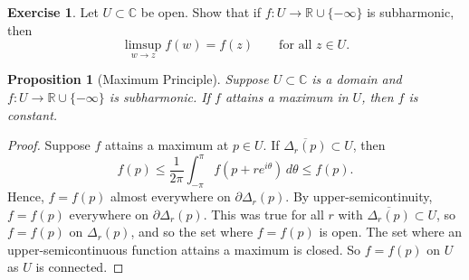 \documentclass[12pt,openany]{book}
\newcommand{\C}{{\mathbb{C}}}
\newcommand{\R}{{\mathbb{R}}}
\theoremstyle{plain}
\newtheorem{prop}[thm]{Proposition}
\theoremstyle{remark}
\theoremstyle{definition}
\newenvironment{exbox}{%
    \def\FrameCommand{\vrule width 1pt \relax\hspace {10pt}}%
    \MakeFramed {\advance \hsize -\width \FrameRestore }%
}{%
    \endMakeFramed
}
\theoremstyle{exercise}
\newtheorem{exercise}{Exercise}[section]
\theoremstyle{example}
\begin{document}
\begin{exbox}
\begin{exercise}
Let $U \subset \C$ be open.
Show that if $f \colon U \to \R \cup\{- \infty \}$ is subharmonic,
then 
\begin{equation*}
\limsup_{w \to z} f(w) = f(z) 
\qquad \text{for all $z \in U$.}
\end{equation*}
\end{exercise}
\end{exbox}

\begin{prop}[Maximum Principle]
Suppose $U \subset \C$ is a domain and $f \colon U \to \R \cup \{ -\infty \}$
is subharmonic.  If $f$ attains a maximum in $U$, then $f$ is constant.
\end{prop}

\begin{proof}
Suppose $f$ attains a maximum at $p \in U$.
If
$\overline{\Delta_r(p)} \subset U$, then
\begin{equation*}
f(p) \leq \frac{1}{2\pi} \int_{-\pi}^{\pi} f(p+re^{i\theta})\, d\theta \leq f(p)
.
\end{equation*}
Hence, $f = f(p)$ almost everywhere on $\partial \Delta_r(p)$.
By upper-semicontinuity, $f = f(p)$ everywhere on $\partial \Delta_r(p)$.
This was true for all $r$
with $\overline{\Delta_r(p)} \subset U$, so $f=f(p)$ on $\Delta_r(p)$,
and so the set where $f=f(p)$ is open.  The set where an upper-semicontinuous
function attains a maximum is closed.  So $f=f(p)$ on $U$ as $U$ is
connected.
\end{proof}
\end{document}

